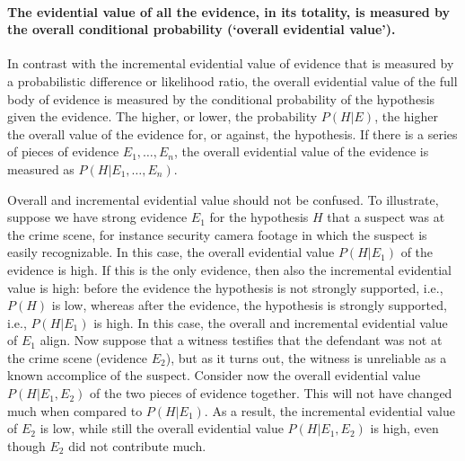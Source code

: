 \documentclass[10pt]{article}
\begin{document}


\paragraph{The evidential value of all the evidence, in its totality, is measured by the overall conditional probability (`overall evidential value'). }

In contrast with the incremental evidential value of evidence that is measured by a probabilistic difference or likelihood ratio, the overall evidential value of the full body of evidence is measured by the conditional probability 
of the hypothesis given the evidence. The higher, or lower, the probability $P(H|E)$, the higher 
the overall value of the evidence for, or against, the hypothesis. If there is a series of pieces of evidence $E_1, \ldots, E_n$, the overall evidential value of the evidence is measured as $P(H|E_1, \ldots, E_n)$.

Overall and incremental evidential value should not be confused. To illustrate, suppose we have strong evidence $E_1$ for the hypothesis $H$ that a suspect was at the crime scene, for instance security camera footage in which the suspect is easily recognizable. In this case, the overall evidential value $P(H|E_1)$ of the evidence is high. If this is the only evidence, then also the incremental evidential value is high: before the evidence the hypothesis is not strongly supported, i.e., $P(H)$ is low, whereas after the evidence, the hypothesis is strongly supported, i.e., $P(H|E_1)$ is high. In this case, the overall and incremental evidential value of $E_1$ align. Now suppose that a witness testifies that the defendant was not at the crime scene (evidence $E_2$), but as it turns out, the witness is unreliable as a known accomplice of the suspect. Consider now the overall evidential value $P(H|E_1, E_2)$ of the two pieces of evidence together. This will not have changed much when compared to $P(H|E_1)$. As a result, the incremental evidential value of $E_2$ is low, while still the overall evidential value $P(H|E_1, E_2)$ is high, even though $E_2$ did not contribute much. 
\end{document}
